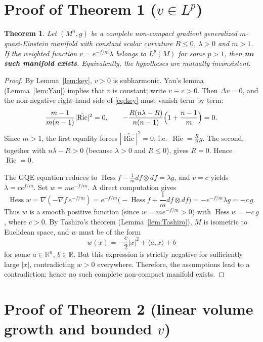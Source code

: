 \documentclass[10pt,a4paper]{amsart}
\newcommand{\Ric}{\operatorname{Ric}}
\newcommand{\Hess}{\operatorname{Hess}}
\newtheorem{theorem}{Theorem}[section]
\begin{document}
\section{Proof of Theorem 1 ($v\in L^p$)}
\label{sec:thm1}

\begin{theorem}\label{thm1}
Let $(M^n,g)$ be a complete non-compact gradient generalized $m$-quasi-Einstein manifold with constant scalar curvature $R\le 0$, $\lambda>0$ and $m>1$.
If the weighted function $v=e^{-f/m}\lambda$ belongs to $L^p(M)$ for some $p>1$, then \textbf{no such manifold exists}. Equivalently, the hypotheses are mutually inconsistent.
\end{theorem}

\begin{proof}
By Lemma~\ref{lem:key}, $v>0$ is subharmonic.
Yau's lemma (Lemma~\ref{lem:Yau}) implies that $v$ is constant; write $v\equiv c>0$.
Then $\Delta v=0$, and the non-negative right-hand side of \eqref{eq:key} must vanish term by term:
\begin{gather*}
\frac{m-1}{m(n-1)}|\hat{\Ric}|^2 = 0,\qquad
-\frac{R(n\lambda-R)}{n(n-1)}\Bigl(1+\frac{n-1}{m}\Bigr) = 0.
\end{gather*}
Since $m>1$, the first equality forces $|\hat{\Ric}|^2=0$, i.e.\ $\Ric = \frac{R}{n}g$.
The second, together with $n\lambda-R>0$ (because $\lambda>0$ and $R\le 0$), gives $R=0$.
Hence $\Ric = 0$.

The GQE equation reduces to $\Hess f - \frac1m df\otimes df = \lambda g$, and $v=c$ yields $\lambda = c e^{f/m}$.
Set $w = m e^{-f/m}$.
A direct computation gives
\[
\Hess w = \nabla( -\nabla f\, e^{-f/m}) = e^{-f/m}\bigl( -\Hess f + \frac1m df\otimes df \bigr)
= -e^{-f/m}\lambda g = -c\,g.
\]
Thus $w$ is a smooth positive function (since $w = m e^{-f/m} > 0$) with $\Hess w = -c\,g$, where $c>0$.
By Tashiro's theorem (Lemma~\ref{lem:Tashiro}), $M$ is isometric to Euclidean space, and $w$ must be of the form
\[
w(x) = -\frac{c}{2}|x|^2 + \langle a, x\rangle + b
\]
for some $a\in\mathbb{R}^n$, $b\in\mathbb{R}$.
But this expression is strictly negative for sufficiently large $|x|$, contradicting $w>0$ everywhere.
Therefore, the assumptions lead to a contradiction; hence no such complete non-compact manifold exists.
\end{proof}

\section{Proof of Theorem 2 (linear volume growth and bounded $v$)}
\label{sec:thm2}
\end{document}
